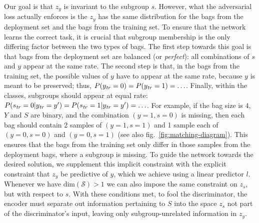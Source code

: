 Our goal is that $z_y$ is invariant to the subgroup $s$.
However, what the adversarial loss actually enforces is the $z_y$ has the same distribution for the bags from the deployment set and the bags from the training set.
To ensure that the network learns the correct task,
it is crucial that subgroup membership is the only differing factor between the two types of bags.
The first step towards this goal is that bags from the deployment set are balanced (or \emph{perfect}):
all combinations of $s$ and $y$ appear at the same rate.
The second step is that, in the bags from the training set, the possible values of $y$ have to appear at the same rate,
because $y$ is meant to be preserved;
thus, $P(y_\mathit{tr}=0)=P(y_\mathit{tr}=1)=\mathellipsis$.
Finally, within the classes, subgroups should appear at equal rate:
$P(s_\mathit{tr}=0|y_\mathit{tr}=y')=P(s_\mathit{tr}=1|y_\mathit{tr}=y')=\mathellipsis$.
For example, if the bag size is 4, $Y$ and $S$ are binary, and the combination $(y=1,s=0)$ is missing,
then each bag should contain 2 samples of $(y=1,s=1)$ and 1 sample each of $(y=0,s=0)$ and $(y=0,s=1)$
(see also fig.~\ref{fig:matching-diagram}).
This ensures that the bags from the training set only differ in those samples from the deployment bags,
where a subgroup is missing.
%
To guide the network towards the desired solution, we supplement this implicit constraint with the explicit constraint that $z_y$ be predictive of $y$, which we achieve using a linear predictor $l$. Whenever we have $\textrm{dim}(\mathcal{S}) > 1$ %
we can also impose the same constraint on $z_s$, but with respect to $s$.
With these conditions met, to fool the discriminator,
the encoder must separate out information pertaining to $S$ into the space $z_s$ not part of the discriminator's input,
leaving only subgroup-unrelated information in $z_y$.

